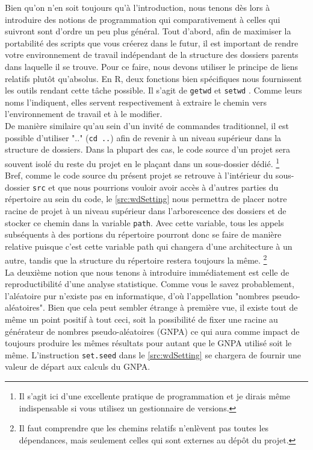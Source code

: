 Bien qu'on n'en soit toujours qu'à l'introduction, nous tenons dès lors à introduire des notions de programmation qui comparativement à celles qui suivront sont d'ordre un peu plus général. Tout d'abord, afin de maximiser la portabilité des scripts que vous créerez dans le futur, il est important de rendre votre environnement de travail indépendant de la structure des dossiers parents dans laquelle il se trouve. Pour ce faire, nous devons utiliser le principe de liens relatifs plutôt qu'absolus. En R, deux fonctions bien spécifiques nous fournissent les outils rendant cette tâche possible. Il s'agit de \texttt{getwd} et \texttt{setwd} \cite{Rfunction:setwd}. Comme leurs noms l'indiquent, elles servent respectivement à extraire le chemin vers l'environnement de travail et à le modifier. \\

De manière similaire qu'au sein d'un invité de commandes traditionnel, il est possible d'utiliser ".." (\texttt{cd ..}) afin de revenir à un niveau supérieur dans la structure de dossiers. Dans la plupart des cas, le code source d'un projet sera souvent isolé du reste du projet en le plaçant dans un sous-dossier dédié. \footnote{Il s'agit ici d'une excellente pratique de programmation et je dirais même indispensable si vous utilisez un gestionnaire de versions.} \\

Bref, comme le code source du présent projet se retrouve à l'intérieur du sous-dossier \texttt{src} \cite{repo:RAQ} et que nous pourrions vouloir avoir accès à d'autres parties du répertoire au sein du code, le \autoref{src:wdSetting} nous permettra de placer notre racine de projet à un niveau supérieur dans l'arborescence des dossiers et de stocker ce chemin dans la variable \texttt{path}. Avec cette variable, tous les appels subséquents à des portions du répertoire pourront donc se faire de manière relative puisque c'est cette variable path qui changera d'une architecture à un autre, tandis que la structure du répertoire restera toujours la même. \footnote{Il faut comprendre que les chemins relatifs n'enlèvent pas toutes les dépendances, mais seulement celles qui sont externes au dépôt du projet.} \\

La deuxième notion que nous tenons à introduire immédiatement est celle de reproductibilité d'une analyse statistique. Comme vous le savez probablement, l'aléatoire pur n'existe pas en informatique, d'où l'appellation "nombres pseudo-aléatoires". Bien que cela peut sembler étrange à première vue, il existe tout de même un point positif à tout ceci, soit la possibilité de fixer une racine au générateur de nombres pseudo-aléatoires (GNPA) ce qui aura comme impact de toujours produire les mêmes résultats pour autant que le GNPA utilisé soit le même. L'instruction \texttt{set.seed} \cite{Rfunction:setseed} dans le \autoref{src:wdSetting} se chargera de fournir une valeur de départ aux calculs du GNPA. \\

